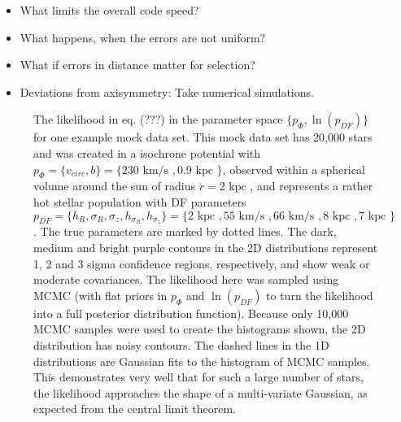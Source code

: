\documentclass[12pt,preprint]{aastex}
\begin{document}
\begin{itemize}
\item What limits the overall code speed?
\item What happens, when the errors are not uniform?
\item What if errors in distance matter for selection?
\item Deviations from axisymmetry: Take numerical simulations.
\end{itemize}



\begin{figure}
\caption{The likelihood in eq. (???) in the parameter space $\{p_\Phi,\ln(p_{DF})\}$ for one example mock data set. This mock data set has 20,000 stars and was created in a isochrone potential with $p_\Phi = \{v_{circ},b \}=\{230 \text{ km/s },0.9\text{ kpc } \}$, observed within a spherical volume around the sun of radius $r = 2 \text{ kpc }$, and represents a rather hot stellar population with DF parameters $p_{DF} = \{ h_R, \sigma_R, \sigma_z,h_{\sigma_R},h_{\sigma_z}\} =\{2 \text{ kpc }, 55 \text{ km/s }, 66 \text{ km/s }, 8 \text{ kpc }, 7 \text{ kpc }\} $.  The true parameters are marked by dotted lines. The dark, medium and bright purple contours in the 2D distributions represent 1, 2 and 3 sigma confidence regions, respectively, and show weak or moderate covariances. The likelihood here was sampled using MCMC (with flat priors in $p_\Phi$ and  $\ln(p_{DF})$ to turn the likelihood into a full posterior distribution function). Because only 10,000 MCMC samples were used to create the histograms shown, the 2D distribution has noisy contours. The dashed lines in the 1D distributions are Gaussian fits to the histogram of MCMC samples. This demonstrates very well that for such a large number of stars, the likelihood approaches the shape of a multi-variate Gaussian, as expected from the central limit theorem.}
\end{figure}

\end{document}
